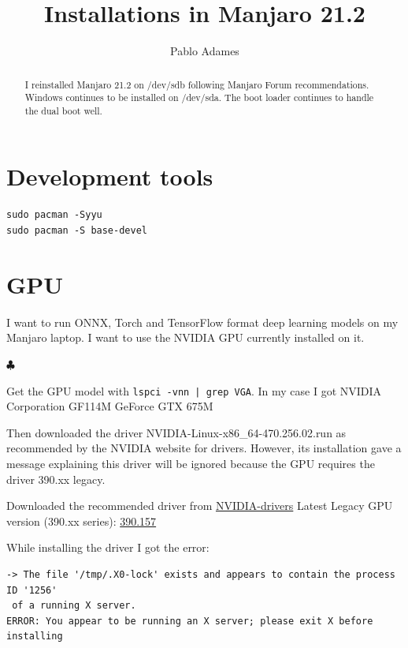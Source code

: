 \documentclass[]{scrartcl}
\title{Installations in Manjaro 21.2}
\author{Pablo Adames}
\begin{document}
\maketitle

\begin{abstract}
I reinstalled Manjaro 21.2 on /dev/sdb following Manjaro Forum recommendations.
Windows continues to be installed on /dev/sda.
The boot loader continues to handle the dual boot well.
\end{abstract}

\section{Development tools}

\begin{verbatim}
sudo pacman -Syyu
sudo pacman -S base-devel
\end{verbatim}


\section{GPU}
\label{sec:gpu}

I want to run ONNX, Torch and TensorFlow format deep learning models on my Manjaro laptop. I want to use the NVIDIA GPU currently installed on it.

\begin{list}{\color{teal}$\clubsuit$}{\color{olive}}
	\item Get the GPU model with \color{black}\texttt{lspci -vnn | grep VGA}. \color{olive} In my case I got \color{black} NVIDIA Corporation GF114M \lbrack{}GeForce GTX 675M\rbrack{}\color{olive} 
	\item Then downloaded the driver \color{black} NVIDIA-Linux-x86\_64-470.256.02.run \color{olive} as recommended by the NVIDIA website for drivers. However, its installation gave a message explaining this driver will be ignored because the GPU requires the driver \color{black}390.xx legacy.\color{olive}
	\item Downloaded the recommended driver from \href{https://www.nvidia.com/en-us/drivers/unix/}{NVIDIA-drivers} \color{black} Latest Legacy GPU version (390.xx series): \href{https://www.nvidia.com/Download/driverResults.aspx/196213/en-us/}{390.157} \color{olive} 
\end{list}


While  installing the driver I got the error:

\begin{verbatim}
-> The file '/tmp/.X0-lock' exists and appears to contain the process ID '1256'
 of a running X server.
ERROR: You appear to be running an X server; please exit X before installing
\end{verbatim}
\end{document}
